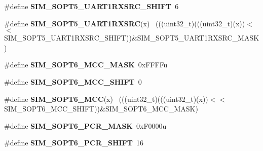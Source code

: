 \begin{DoxyCompactItemize}
\item 
\hypertarget{group___s_i_m___register___masks_ga098fcb3123342f9cd96869c69d2fb7a9}{}\#define {\bfseries S\+I\+M\+\_\+\+S\+O\+P\+T5\+\_\+\+U\+A\+R\+T1\+R\+X\+S\+R\+C\+\_\+\+S\+H\+I\+F\+T}~6\label{group___s_i_m___register___masks_ga098fcb3123342f9cd96869c69d2fb7a9}

\item 
\hypertarget{group___s_i_m___register___masks_ga49ea8079e7dc9fbf82dee1acca0cdf10}{}\#define {\bfseries S\+I\+M\+\_\+\+S\+O\+P\+T5\+\_\+\+U\+A\+R\+T1\+R\+X\+S\+R\+C}(x)                                ~(((uint32\+\_\+t)(((uint32\+\_\+t)(x))$<$$<$S\+I\+M\+\_\+\+S\+O\+P\+T5\+\_\+\+U\+A\+R\+T1\+R\+X\+S\+R\+C\+\_\+\+S\+H\+I\+F\+T))\&S\+I\+M\+\_\+\+S\+O\+P\+T5\+\_\+\+U\+A\+R\+T1\+R\+X\+S\+R\+C\+\_\+\+M\+A\+S\+K)\label{group___s_i_m___register___masks_ga49ea8079e7dc9fbf82dee1acca0cdf10}

\item 
\hypertarget{group___s_i_m___register___masks_ga8d089c62b38faca3f0de4c1206f41343}{}\#define {\bfseries S\+I\+M\+\_\+\+S\+O\+P\+T6\+\_\+\+M\+C\+C\+\_\+\+M\+A\+S\+K}~0x\+F\+F\+F\+Fu\label{group___s_i_m___register___masks_ga8d089c62b38faca3f0de4c1206f41343}

\item 
\hypertarget{group___s_i_m___register___masks_gad5ce806756effc6a8ca8fdf8159b11ed}{}\#define {\bfseries S\+I\+M\+\_\+\+S\+O\+P\+T6\+\_\+\+M\+C\+C\+\_\+\+S\+H\+I\+F\+T}~0\label{group___s_i_m___register___masks_gad5ce806756effc6a8ca8fdf8159b11ed}

\item 
\hypertarget{group___s_i_m___register___masks_ga1b99e76d8b9d4d4dd12f358e02c8802f}{}\#define {\bfseries S\+I\+M\+\_\+\+S\+O\+P\+T6\+\_\+\+M\+C\+C}(x)                                              ~(((uint32\+\_\+t)(((uint32\+\_\+t)(x))$<$$<$S\+I\+M\+\_\+\+S\+O\+P\+T6\+\_\+\+M\+C\+C\+\_\+\+S\+H\+I\+F\+T))\&S\+I\+M\+\_\+\+S\+O\+P\+T6\+\_\+\+M\+C\+C\+\_\+\+M\+A\+S\+K)\label{group___s_i_m___register___masks_ga1b99e76d8b9d4d4dd12f358e02c8802f}

\item 
\hypertarget{group___s_i_m___register___masks_gad6d461c055e6c5863fe1888fb18f4ba2}{}\#define {\bfseries S\+I\+M\+\_\+\+S\+O\+P\+T6\+\_\+\+P\+C\+R\+\_\+\+M\+A\+S\+K}~0x\+F0000u\label{group___s_i_m___register___masks_gad6d461c055e6c5863fe1888fb18f4ba2}

\item 
\hypertarget{group___s_i_m___register___masks_gaaf697394e37305f51c1a6bd8de1a3df2}{}\#define {\bfseries S\+I\+M\+\_\+\+S\+O\+P\+T6\+\_\+\+P\+C\+R\+\_\+\+S\+H\+I\+F\+T}~16\label{group___s_i_m___register___masks_gaaf697394e37305f51c1a6bd8de1a3df2}


\end{DoxyCompactItemize}
